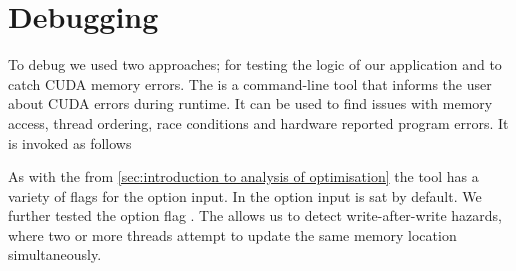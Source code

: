 \section{Debugging}
\label{sec:debugging and profiling}

To debug we used two approaches;  for testing the logic of our application and  to catch CUDA memory errors.
The  is a command-line tool that informs the user about CUDA errors during runtime.
It can be used to find issues with memory access, thread ordering, race conditions and hardware reported program errors.
It is invoked as follows
%
\begin{quote}
\end{quote}
%
As with the  from \cref{sec:introduction to analysis of optimisation} the  tool has a variety of flags for the option input.
In the option input  is sat by default.
We further tested the option flag .
The  allows us to detect write-after-write hazards, where two or more threads attempt to update the same memory location simultaneously.
